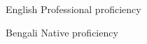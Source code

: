 
\begin{cvskills}

  \cvskill
    {English} %
    {Professional proficiency} %

  \cvskill
    {Bengali} %
    {Native proficiency} %

\end{cvskills}
